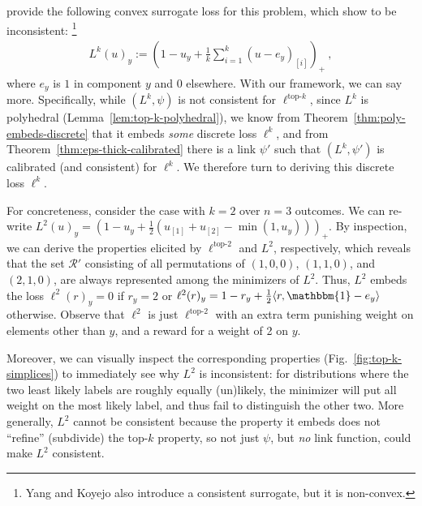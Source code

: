 \documentclass[12pt]{article}
\newcommand{\R}{\mathcal{R}}
\newcommand{\inprod}[2]{\langle #1, #2 \rangle}%
\newcommand{\ones}{\mathbbm{1}}
\newcommand{\elltopk}{\ell^{\text{top-$k$}}}
\newcommand{\elltop}[1]{\ell^{\text{top-$#1$}}}
\begin{document}
\citet{lapin2015top, lapin2016loss, lapin2018analysis} provide the following convex surrogate loss for this problem, which \citet{yang2018consistency} show to be inconsistent:%
\footnote{Yang and Koyejo also introduce a consistent surrogate, but it is non-convex.}
\begin{align}\label{eq:L-2-surrogate}
L^k(u)_y := \left( 1-u_y + \tfrac{1}{k} \textstyle\sum_{i=1}^k (u - e_y)_{[i]} \right)_+~,
\end{align}
where $e_y$ is $1$ in component $y$ and 0 elsewhere.
With our framework, we can say more.
Specifically, while $(L^k,\psi)$ is not consistent for $\elltopk$, since $L^k$ is polyhedral (Lemma~\ref{lem:top-k-polyhedral}), we know from Theorem~\ref{thm:poly-embeds-discrete} that it embeds \emph{some} discrete loss $\ell^k$, and from Theorem~\ref{thm:eps-thick-calibrated} there is a link $\psi'$ such that $(L^k,\psi')$ is calibrated (and consistent) for $\ell^k$.
We therefore turn to deriving this discrete loss $\ell^k$.

For concreteness, consider the case with $k = 2$ over $n=3$ outcomes.
We can re-write $L^2(u)_y = \left(1 - u_y + \tfrac 1 2 (u_{[1]}+ u_{[2]} - \min(1,u_y))\right)_+$.
By inspection, we can derive the properties elicited by $\elltop{2}$ and $L^2$, respectively, which reveals that the set $\R'$ consisting of all permutations of $(1,0,0)$, $(1,1,0)$, and $(2,1,0)$, are always represented among the minimizers of $L^2$.
Thus, $L^2$ embeds the loss $\ell^2(r)_y = 0$ if $r_y = 2$ or $\ell^2(r)_y = 1 - r_y + \tfrac 1 2 \inprod{r}{\ones-e_y}$ otherwise.
Observe that $\ell^2$ is just $\elltop{2}$ with an extra term punishing weight on elements other than $y$, and a reward for a weight of 2 on $y$.

Moreover, we can visually inspect the corresponding properties (Fig.~\ref{fig:top-k-simplices}) to immediately see why $L^2$ is inconsistent: for distributions where the two least likely labels are roughly equally (un)likely, the minimizer will put all weight on the most likely label, and thus fail to distinguish the other two.
More generally, $L^2$ cannot be consistent because the property it embeds does not ``refine'' (subdivide) the top-$k$ property, so not just $\psi$, but \emph{no} link function, could make $L^2$ consistent.
\end{document}
